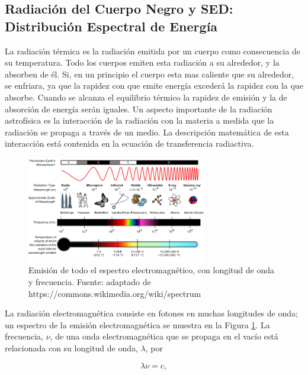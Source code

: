 \documentclass[12pt]{article}
\begin{document}
\subsection{Radiación del Cuerpo Negro y SED: Distribución Espectral de Energía}\label{sec:radiacion}
La radiación térmica es la radiación emitida por un cuerpo como consecuencia de su temperatura.
Todo los cuerpos emiten esta radiación a su alrededor, y la absorben de él. Si, en 
un principio el cuerpo esta mas caliente que su alrededor, se enfriara, ya que la rapidez con que emite 
energía excederá la rapidez con la que absorbe. Cuando  se alcanza el equilibrio térmico la 
rapidez de emisión y la de absorción de energía serán iguales.
Un aspecto importante de la radiación astrofísica es la interacción de la radiación con la materia a 
medida que la radiación se propaga a través de un medio. La descripción matemática de esta interacción 
está contenida en la ecuación de transferencia radiactiva.
\begin{figure}[H]
    \includegraphics[width=0.7\textwidth]{images/EM_Spectrum_Properties_edit.png}
    \centering
    \caption{Emisión de todo el espectro electromagnético, con longitud de onda y frecuencia.
    Fuente: adaptado de https://commons.wikimedia.org/wiki/spectrum}
    \label{fig:spectrum_radiacion}
\end{figure}
La radiación electromagnética consiste en fotones en muchas longitudes de onda; un espectro de la 
emisión electromagnética se muestra en la Figura \ref{fig:spectrum_radiacion}. La frecuencia, $\nu$, 
de una onda electromagnética que se propaga en el vacío está relacionada con su longitud de onda, 
$\lambda$, por

\begin{equation}
    \lambda \nu = c,
    \label{eq:luz}
\end{equation}
\end{document}
